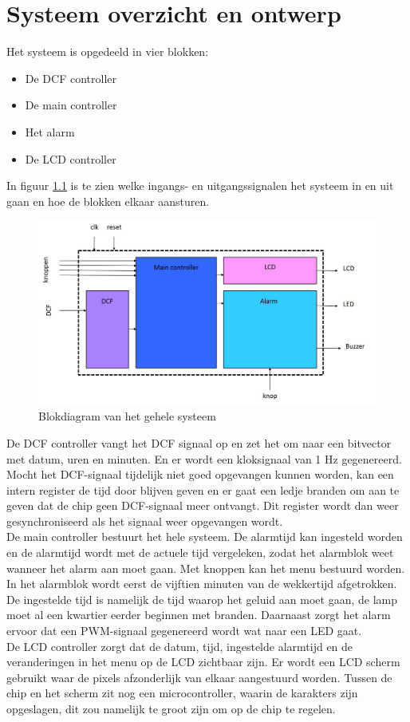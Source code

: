 
\chapter{Systeem overzicht en ontwerp}
Het systeem is opgedeeld in vier blokken:
\begin{itemize}
\item De DCF controller
\item De main controller
\item Het alarm
\item De LCD controller
\end{itemize}

\noindent In figuur \ref{fig:blokdiagram} is te zien welke ingangs- en uitgangssignalen het systeem in en uit gaan en hoe de blokken elkaar aansturen.

\begin{figure}[h!]
\center
\includegraphics[width=15cm]{figure/blokdiagram}
\caption{Blokdiagram van het gehele systeem}
\label{fig:blokdiagram}
\end{figure}

\noindent De DCF controller vangt het DCF signaal op en zet het om naar een bitvector met datum, uren en minuten. En er wordt een kloksignaal van 1 Hz gegenereerd. Mocht het DCF-signaal tijdelijk niet goed opgevangen kunnen worden, kan een intern register de tijd door blijven geven en er gaat een ledje branden om aan te geven dat de chip geen DCF-signaal meer ontvangt. Dit register wordt dan weer gesynchroniseerd als het signaal weer opgevangen wordt.\\
De main controller bestuurt het hele systeem. De alarmtijd kan ingesteld worden en de alarmtijd wordt met de actuele tijd vergeleken, zodat het alarmblok weet wanneer het alarm aan moet gaan. Met knoppen kan het menu bestuurd worden.\\
In het alarmblok wordt eerst de vijftien minuten van de wekkertijd afgetrokken. De ingestelde tijd is namelijk de tijd waarop het geluid aan moet gaan, de lamp moet al een kwartier eerder beginnen met branden. Daarnaast zorgt het alarm ervoor dat een PWM-signaal gegenereerd wordt wat naar een LED gaat. \\
De LCD controller zorgt dat de datum, tijd, ingestelde alarmtijd en de veranderingen in het menu op de LCD zichtbaar zijn. Er wordt een LCD scherm gebruikt waar de pixels afzonderlijk van elkaar aangestuurd worden. Tussen de chip en het scherm zit nog een microcontroller, waarin de karakters zijn opgeslagen, dit zou namelijk te groot zijn om op de chip te regelen.
